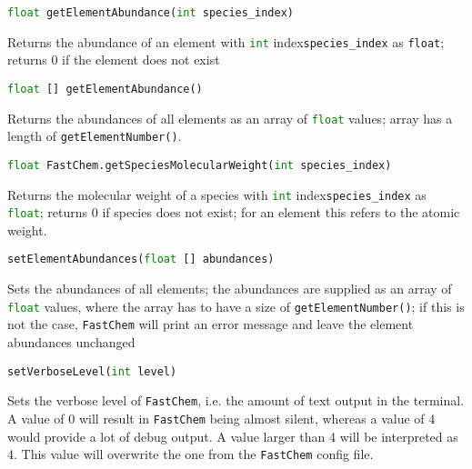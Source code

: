 \documentclass[numbers=noenddot]{fcmanual}
\newcommand{\fc}{\texttt{FastChem}\xspace}
\begin{document}
\bigbreak

\lstinline[language=Python]!float getElementAbundance(int species_index)!
\begin{addmargin}[25pt]{0pt}
	Returns the abundance of an element with \lstinline[language=Python]!int! index\footnotemark[\value{footnote}] \lstinline!species_index! as \lstinline!float!; returns 0 if the element does not exist
\end{addmargin}


\bigbreak

\lstinline[language=Python]!float [] getElementAbundance()!
\begin{addmargin}[25pt]{0pt}
	Returns the abundances of all elements as an array of \lstinline[language=Python]!float! values; array has a length of \lstinline!getElementNumber()!.
\end{addmargin}


\bigbreak

\lstinline[language=Python]!float FastChem.getSpeciesMolecularWeight(int species_index)!
\begin{addmargin}[25pt]{0pt}
	Returns the molecular weight of a species with \lstinline[language=Python]!int! index\footnotemark[\value{footnote}] \lstinline!species_index! as \lstinline[language=Python]!float!; returns 0 if species does not exist; for an element this refers to the atomic weight.
\end{addmargin}


\bigbreak

\lstinline[language=Python]!setElementAbundances(float [] abundances)!
\begin{addmargin}[25pt]{0pt}
	Sets the abundances of all elements; the abundances are supplied as an array of \lstinline[language=Python]!float! values, where the array has to have a size of \lstinline[language=Python]!getElementNumber()!; if this is not the case, \fc will print an error message and leave the element abundances unchanged
\end{addmargin}

\bigbreak

\lstinline[language=Python]!setVerboseLevel(int level)!
\begin{addmargin}[25pt]{0pt}
	Sets the verbose level of \fc, i.e. the amount of text output in the terminal. A value of 0 will result in \fc being almost silent, whereas a value of 4 would provide a lot of debug output. A value larger than 4 will be interpreted as 4. This value will overwrite the one from the \fc config file.
\end{addmargin}
\end{document}
